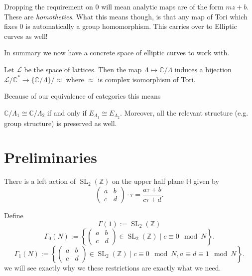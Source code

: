 \documentclass[11pt]{article}
\newcommand{\BB}[1]{\mathbb{#1}} %
\newcommand{\script}[1]{\mathcal{#1}} %
\newcommand{\CC}{\BB{C}}
\newcommand{\ZZ}{\BB{Z}}
\newcommand{\HH}{\BB{H}}
\newcommand{\DD}{\BB{D}}
\newcommand{\SL}{\operatorname{SL}}
\theoremstyle{plain}
\theoremstyle{remark}
\begin{document}
\begin{note}
	Dropping the requirement on $0$ will mean analytic maps are of the form $mz+b$. These are \emph{homotheties}. What this means though, is that any map of Tori which fixes $0$ is automatically a group homomorphism. This carries over to Elliptic curves as well!
\end{note}

In summary we now have a concrete space of elliptic curves to work with.

\begin{thm}\label{latticetori}
	Let $\script{L}$ be the space of lattices. Then the map $\Lambda\mapsto \CC/\Lambda$ induces a bijection $\script{L}/\CC^\ast \to \{\CC/\Lambda\}/\approx$ where $\approx$ is complex isomorphism of Tori.
\end{thm}

Because of our equivalence of categories this means
\begin{thm}
	$\CC/\Lambda_1 \cong \CC/\Lambda_2$ if and only if $E_{\Lambda_1}\cong E_{\Lambda_2}$. Moreover, all the relevant structure (e.g. group structure) is preserved as well.
\end{thm}



\section{Preliminaries}

There is a left action of $\SL_2(\ZZ)$ on the upper half plane $\HH$ given by
$$
\begin{pmatrix}a & b \\ c & d\end{pmatrix} \cdot \tau = \frac{a\tau+b}{c\tau+d}.
$$

\noindent
Define
$$
	\Gamma(1) := \SL_2(\ZZ)
$$
$$
	\Gamma_0(N) := \left\{\begin{pmatrix}a & b \\ c & d\end{pmatrix}\in\SL_2(\ZZ) \mid  c\equiv 0\mod{N}\right\}.
$$
$$
	\Gamma_1(N) := \left\{\begin{pmatrix}a & b \\ c & d\end{pmatrix}\in\SL_2(\ZZ) \mid  c\equiv 0\mod{N}, a\equiv d\equiv 1\mod{N}\right\}.
$$
we will see exactly why we these restrictions are exactly what we need.
\end{document}
